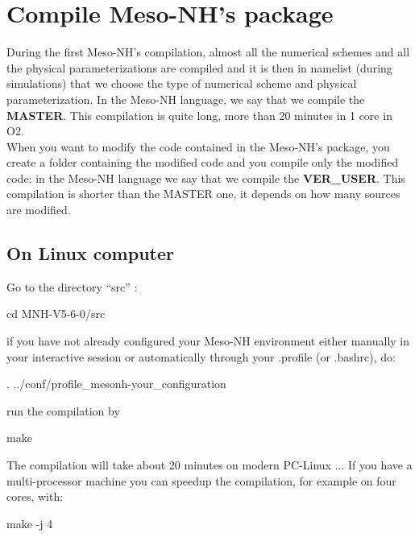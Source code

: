 \section{Compile Meso-NH's package}
\label{sec:compile_mesonh_package}

During the first Meso-NH's compilation, almost all the numerical schemes and all the physical parameterizations are compiled and it is then in namelist (during simulations) that we choose the type of numerical scheme and physical parameterization. In the Meso-NH language, we say that we compile the \textbf{MASTER}. This compilation is quite long, more than 20 minutes in 1 core in O2. \\

When you want to modify the code contained in the Meso-NH's package, you create a folder containing the modified code and you compile only the modified code: in the Meso-NH language we say that we compile the \textbf{VER\_USER}. This compilation is shorter than the MASTER one, it depends on how many sources are modified.

\subsection{On Linux computer}

Go to the directory ``src'' :
\begin{bashcode}
cd  MNH-V5-6-0/src
\end{bashcode}

if you have not already configured your Meso-NH environment either manually in your interactive session or automatically through your .profile (or .bashrc), do:
\begin{bashcode}
. ../conf/profile_mesonh-your_configuration
\end{bashcode}

run the compilation by
\begin{bashcode}
make
\end{bashcode}

The compilation will take about 20 minutes on modern PC-Linux ... If you have a multi-processor machine you can speedup the compilation, for example on four cores, with:
\begin{bashcode}
make -j 4
\end{bashcode}

